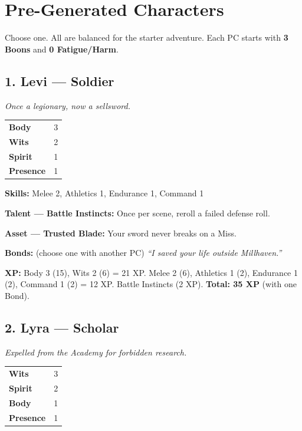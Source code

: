 \documentclass[11pt]{book}
\begin{document}
\clearpage

\chapter{Pre-Generated Characters}
\label{ch:pregens}

Choose one. All are balanced for the starter adventure. Each PC starts with \textbf{3 Boons} and \textbf{0 Fatigue/Harm}.

\section*{1. Levi --- Soldier}

\textit{Once a legionary, now a sellsword.}

\begin{tabular}{ll}
\textbf{Body} & 3 \\
\textbf{Wits} & 2 \\
\textbf{Spirit} & 1 \\
\textbf{Presence} & 1 \\
\end{tabular}

\textbf{Skills:} Melee 2, Athletics 1, Endurance 1, Command 1

\textbf{Talent --- Battle Instincts:} Once per scene, reroll a failed defense roll.

\textbf{Asset --- Trusted Blade:} Your sword never breaks on a Miss.

\textbf{Bonds:} (choose one with another PC) \textit{``I saved your life outside Millhaven.''}

\textbf{XP:} Body 3 (15), Wits 2 (6) = 21 XP. Melee 2 (6), Athletics 1 (2), Endurance 1 (2), Command 1 (2) = 12 XP. Battle Instincts (2 XP). \textbf{Total: 35 XP} (with one Bond).

\section*{2. Lyra --- Scholar}

\textit{Expelled from the Academy for forbidden research.}

\begin{tabular}{ll}
\textbf{Wits} & 3 \\
\textbf{Spirit} & 2 \\
\textbf{Body} & 1 \\
\textbf{Presence} & 1 \\
\end{tabular}
\end{document}
